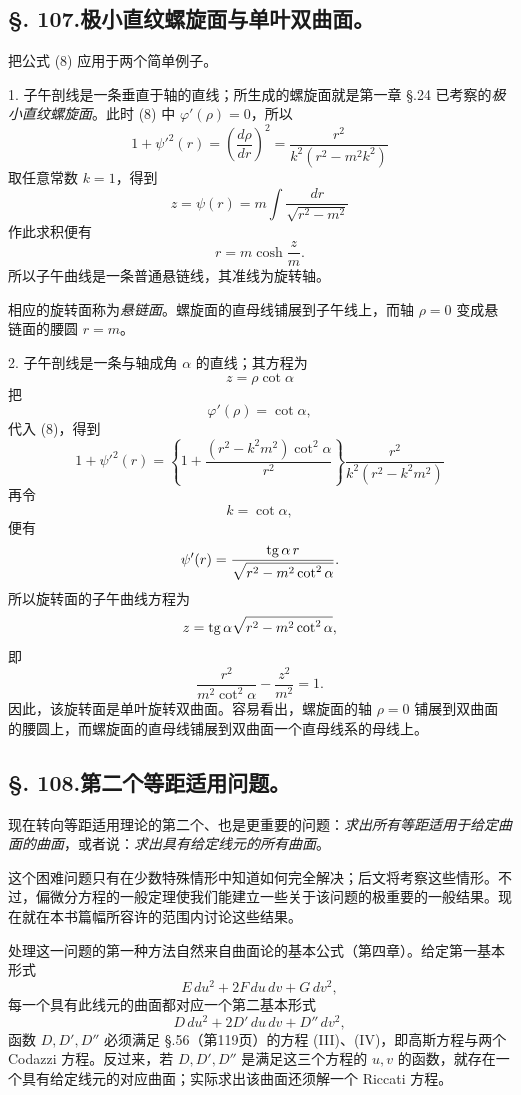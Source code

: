 \subsection*{\S. 107.\quad 极小直纹螺旋面与单叶双曲面。}

把公式 (8) 应用于两个简单例子。

1. 子午剖线是一条垂直于轴的直线；所生成的螺旋面就是第一章 \S.24 已考察的\emph{极小直纹螺旋面}。此时 (8) 中 \(\varphi'(\rho)=0\)，所以
\[
 1+\psi'^2(r)=\left(\frac{d\rho}{dr}\right)^2=\frac{r^2}{k^2(r^2-m^2k^2)}
\]
取任意常数 \(k=1\)，得到
\[
 z=\psi(r)=m\int\frac{dr}{\sqrt{r^2-m^2}}
\]
作此求积便有
\[
 r=m\cosh\frac{z}{m}.
\]
所以子午曲线是一条普通悬链线，其准线为旋转轴。

相应的旋转面称为\emph{悬链面}。螺旋面的直母线铺展到子午线上，而轴 \(\rho=0\) 变成悬链面的腰圆 \(r=m\)。

2. 子午剖线是一条与轴成角 \(\alpha\) 的直线；其方程为
\[
 z=\rho\cot\alpha
\]
把
\[
 \varphi'(\rho)=\cot\alpha,
\]
代入 (8)，得到
\[
 1+\psi'^2(r)=\left\{1+\frac{(r^2-k^2m^2)\cot^2\alpha}{r^2}\right\}
 \frac{r^2}{k^2(r^2-k^2m^2)}
\]
再令
\[
 k=\cot\alpha,
\]
便有
\[
 \psi'(r)=\frac{\operatorname{tg}\alpha\,r}{\sqrt{r^2-m^2\cot^2\alpha}}.
\]
所以旋转面的子午曲线方程为
\[
 z=\operatorname{tg}\alpha\sqrt{r^2-m^2\cot^2\alpha},
\]
即
\[
 \frac{r^2}{m^2\cot^2\alpha}-\frac{z^2}{m^2}=1.
\]
因此，该旋转面是单叶旋转双曲面。容易看出，螺旋面的轴 \(\rho=0\) 铺展到双曲面的腰圆上，而螺旋面的直母线铺展到双曲面一个直母线系的母线上。

\subsection*{\S. 108.\quad 第二个等距适用问题。}

现在转向等距适用理论的第二个、也是更重要的问题：\emph{求出所有等距适用于给定曲面的曲面}，或者说：\emph{求出具有给定线元的所有曲面}。

这个困难问题只有在少数特殊情形中知道如何完全解决；后文将考察这些情形。不过，偏微分方程的一般定理使我们能建立一些关于该问题的极重要的一般结果。现在就在本书篇幅所容许的范围内讨论这些结果。

处理这一问题的第一种方法自然来自曲面论的基本公式（第四章）。给定第一基本形式
\[
 E\,du^2+2F\,du\,dv+G\,dv^2,
\]
每一个具有此线元的曲面都对应一个第二基本形式
\[
 D\,du^2+2D'\,du\,dv+D''\,dv^2,
\]
函数 \(D,D',D''\) 必须满足 \S.56（第119页）的方程 (III)、(IV)，即高斯方程与两个 Codazzi 方程。反过来，若 \(D,D',D''\) 是满足这三个方程的 \(u,v\) 的函数，就存在一个具有给定线元的对应曲面；实际求出该曲面还须解一个 Riccati 方程。

